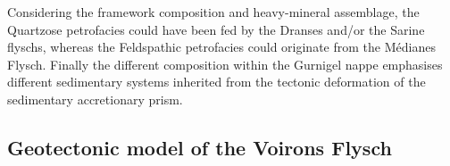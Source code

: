 \documentclass[twoside]{article}
\begin{document}
Considering the framework composition and heavy-mineral assemblage, the Quartzose petrofacies could have been fed by the Dranses and/or the Sarine flyschs, whereas the Feldspathic petrofacies could originate from the Médianes Flysch. Finally the different composition within the Gurnigel nappe emphasises different sedimentary systems inherited from the tectonic deformation of the sedimentary accretionary prism.


\subsection{Geotectonic model of the Voirons Flysch}
\end{document}
